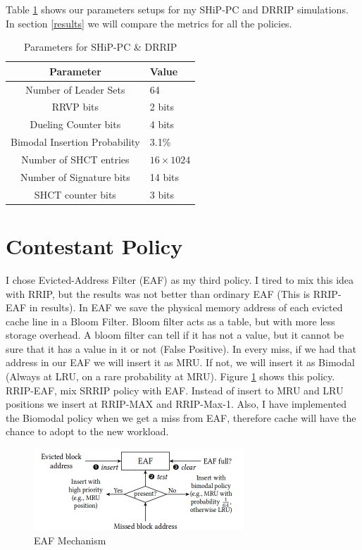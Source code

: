 \documentclass{article}
\begin{document}
Table \ref{defines} shows our parameters setups for my SHiP-PC and DRRIP simulations. In section \ref{results} we will compare the metrics for all the policies.

\begin{table}
\centering
\begin{tabular}{ c | l }
  Parameter & Value \\ [0.5ex] 
  \hline \hline
  Number of Leader Sets & 64 \\
  RRVP bits & 2 bits\\
  Dueling Counter bits & 4 bits \\
  Bimodal Insertion Probability & 3.1\% \\
  Number of SHCT entries & $16\times1024$ \\
  Number of Signature bits & 14 bits \\
  SHCT counter bits & 3 bits \\
\end{tabular}
\caption{Parameters for SHiP-PC \& DRRIP}
\label{defines}
\end{table}


\section{Contestant Policy}
I chose Evicted-Address Filter (EAF)\cite{eaf} as my third policy. I tired to mix this idea with RRIP, but the results was not better than ordinary EAF (This is RRIP-EAF in results). In EAF we save the physical memory address of each evicted cache line in a Bloom Filter. Bloom filter acts as a table, but with more less storage overhead. A bloom filter can tell if it has not a value, but it cannot be sure that it has a value in it or not (False Positive). In every miss, if we had that address in our EAF we will insert it as MRU. If not, we will insert it as Bimodal (Always at LRU, on a rare probability at MRU). Figure \ref{pic-eaf} shows this policy.
RRIP-EAF, mix SRRIP policy with EAF. Instead of insert to MRU and LRU positions we insert at RRIP-MAX and RRIP-Max-1. Also, I have implemented the Biomodal policy when we get a miss from EAF, therefore cache will have the chance to adopt to the new workload.

\begin{figure}[h!]
  \label{pic-eaf}
  \centering
    \includegraphics[width=0.7\textwidth]{eaf.png}
    \caption{EAF Mechanism}
\end{figure}
\end{document}
